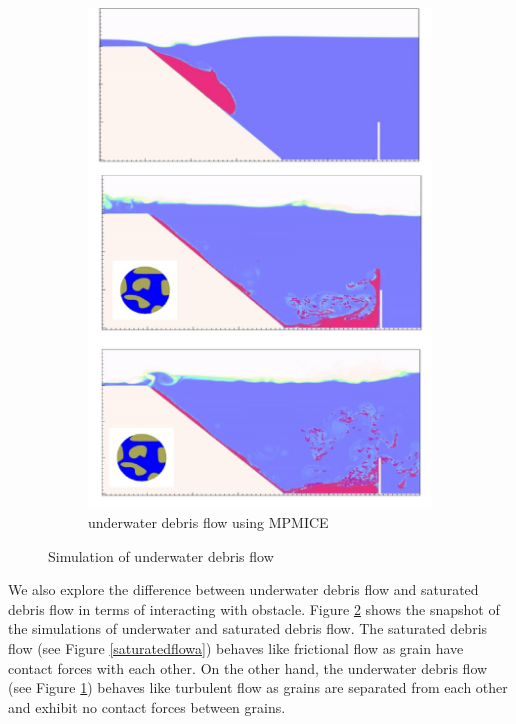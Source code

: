 \documentclass[preprint,12pt]{elsarticle}
\begin{document}
\begin{figure}
\begin{subfigure}[d]{0.5\linewidth}
\includegraphics[width=\linewidth]{MPMICE_debris.jpg}
\caption{underwater debris flow using MPMICE}
\label{saturatedflowb}
\end {subfigure}
\caption{Simulation of underwater debris flow}
\label{saturatedflow}
\end {figure}
%
%
We also explore the difference between underwater debris flow and saturated debris flow in terms of interacting with obstacle. Figure \ref{saturatedflow} shows the snapshot of the simulations of underwater and saturated debris flow. The saturated debris flow (see Figure \ref{saturatedflowa}) behaves like frictional flow as grain have contact forces with each other. On the other hand, the underwater debris flow (see Figure \ref{saturatedflowb}) behaves like turbulent flow as grains are separated from each other and exhibit no contact forces between grains.  \\
\end{document}
